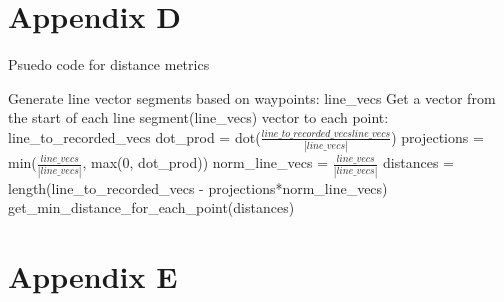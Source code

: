 %
%

\chapter{Appendix D}\label{app:app04}
Psuedo code for distance metrics
\begin{algorithm}
    Generate line vector segments based on waypoints: line_vecs
    Get a vector from the start of each line segment(line_vecs) vector to each point: line_to_recorded_vecs
    dot_prod = dot($\frac{line\_to\_recorded\_vecsline\_vecs}{|line\_vecs|}$)
    projections = min($\frac{line\_vecs}{|line\_vecs|}$, max(0, dot_prod))
    norm_line_vecs = $\frac{line\_vecs}{|line\_vecs|}$
    distances = length(line_to_recorded_vecs - projections*norm_line_vecs)
    get_min_distance_for_each_point(distances)

\end{algorithm}

\chapter{Appendix E}\label{ch:appendix-e}
\begin{figure}[h!]
    
\end{figure}
